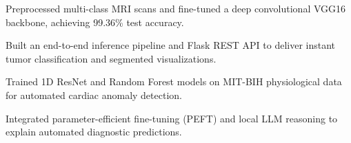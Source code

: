\documentclass[../main.tex]{subfiles}
\begin{document}
\begin{tightemize}
\item Preprocessed multi-class MRI scans and fine-tuned a deep convolutional VGG16 backbone, achieving 99.36\% test accuracy.
\item Built an end-to-end inference pipeline and Flask REST API to deliver instant tumor classification and segmented visualizations.
\end{tightemize}
\sectionsep

\begin{tightemize}
\item Trained 1D ResNet and Random Forest models on MIT-BIH physiological data for automated cardiac anomaly detection.
\item Integrated parameter-efficient fine-tuning (PEFT) and local LLM reasoning to explain automated diagnostic predictions.
\end{tightemize}
\end{document}
